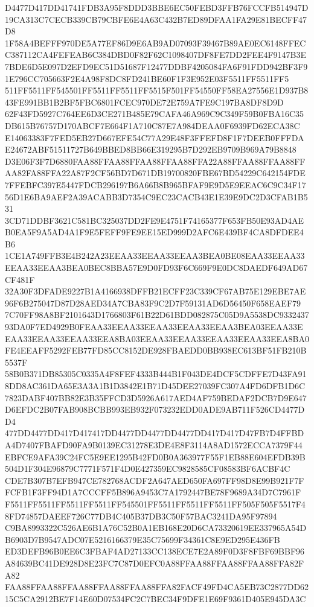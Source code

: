 \documentclass[UTF8,fontset=fandol,zihao=-4,a4paper]{ctexart}
\begin{document}
{{D4477D417DD41741FDB3A95F8DDD3BBE6EC50FEBD3FFB76FCCFB514947D19CA313C7CECB339CB79CBFE6E4A63C432B7ED89DFAA1FA29E81BECFF47D8
1F58A4BEFFF970DE5A77EF86D9E6AB9AD07093F39467B89AE0EC6148FFECC387112CA4FEFEAB6C384DBD0F82F62C1098407DF8FE7DD2FEE4F9147B3E
7BDE6D5E097D2EFD9EC51D51687F12477DDBF4205084FA6F91FDD942BF3F91E796CC705663F2E4A98F8DC8FD241BE60F1F3E952E03F5511FF5511FF5
511FF5511FF545501FF5511FF5511FF5515F501FF54550FF58EA27556E1D937B843FE991BB1B2BF5FBC6801FCEC970DE72E759A7FE9C197BA8DF8D9D
62F43FD5927C764EE6D3CE271B485E79CAFA46A969C9C349F59B0FBA16C35DB615B76757D170ABCF7E664F1A710C87E7A984DEAA0F6939FD62ECA38C
E14063383F7FED5EB27D667EFE54C77A29E48F3FFEFD8F1F7DEEB0FFFDAE24672ABF51511727B649BBED8BB66E319295B7D292EB9709B969A79B8848
D3E06F3F7D6880FAA88FFAA88FFAA88FFAA88FFA22A88FFAA88FFAA88FFAA82FA88FFA22A87F2CF56BD7D671DB19700820FBE67BD54229C642154FDE
7FFEBFC397E5447FDCB296197B6A66B8B965BFAF9E9D5E9EEAC6C9C34F1756D1E6BA9AEF2A39ACABB3D7354C9EC23CACB43E1E39E9DC2D3CFAB1B531
3CD71DDBF3621C581BC325037DD2FE9E4751F74165377F653FB50E93AD4AEB0EA5F9A5AD4A1F9E5FEFF9FE9EE15ED999D2AFC6E439BF4CA8DFDEE4B6
1CE1A749FFB3E4B242A23EEAA33EEAA33EEAA3BEA0BE08EAA33EEAA33EEAA33EEAA3BEA0BEC8BBA57E9D0FD93F6C669F9E0DC8DAEDF649AD67CF481F
32A30F3DFADE9227B1A4166938DFFB21ECFF23C339CF67AB75E129EBE7AE96F6B275047D87D28AED34A7CBA83F9C2D7F59131AD6D56450F658EAEF79
7C70FF98A8BF2101643D1766803F61B22D61BDD082875C05D9A5538DC933243793DA0F7ED4929B0FEAA33EEAA33EEAA33EEAA33EEAA3BEA03EEAA33E
EAA33EEAA33EEAA33EEA8BA03EEAA33EEAA33EEAA33EEAA33EEA8BA0FE4EEAFF5292FEB77FD85CC8152DE928FBAEDD0BB938EC613BF51FB210B5537F
58B0B371DB85305C0335A4F8FEF4333B444B1F043DE4DCF5CDFFE7D43FA918DD8AC361DA65E3A3A1B1D3842E1B71D45DEE27039FC307A4FD6DFB1D6C
7823DABF407BB82E3B35FFCD3D5926A617AED4AF759BEDAF2DCB7D9E647D6EFDC2B07FAB908BCBB993EB932F073232EDD0ADE9AB711F526CD4477DD4
477DD4477DD417D417417DD4477DD4477DD4477DD417D417D47FB7D4FFBDA4D7407FBAFD90FA9B0139EC31278E3DE4E8F3114A8AD1572ECCA7379F44
EBFCE9AFA39C24FC5E9EE1295B42FD0B0A363977F55F1EB88E604EFDB39B504D1F304E96879C7771F571F4D0E427359EC9828585CF08583BF6ACBF4C
CDE7B307B7EFB947CE782768ACDF2A647AED650FA697FF98D8E99B921F7FFCFB1F3FF94D1A7CCCFF5B896A9453C7A1792447BE78F9689A34D7C7961F
F5511FF5511FF5511FF5511FF545501FF5511FF5511FF5511FF505F505F5517F48FD74857DAEEF726C77DB4C405B37DB3C50F57BAC3241DA95F97894
C9BA8993322C526AE6B1A76C52B0A1EB168E20D6CA73320619EE337965A54DB6903D7B9547ADC07E5216166379E35C75699F34361C8E9ED295E436FB
ED3DEFB96B0EE6C3FBAF4AD27133CC138ECE7E2A89F0D3F8FBF69BBF96A84639BC41DE928D8E23FC7C87D0EFC0A88FFAA88FFAA88FFAA88FFA82FA82
FAA88FFAA88FFAA88FFAA88FFAA88FFA82FACF49FD4CA5EB73C2877DD6215C5CA2912BE7F14E60D07534FC2C7BEC34F9DFE1E69F9361D405E945DA3C
}}
\end{document}
